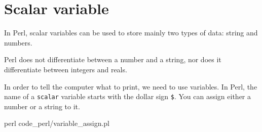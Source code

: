 \documentclass[]{book}
\makeatletter
\newenvironment{Shaded}{\begin{snugshade}}{\end{snugshade}}
\newcommand{\CharTok}[1]{\textcolor[rgb]{0.31,0.60,0.02}{#1}}
\newcommand{\CommentTok}[1]{\textcolor[rgb]{0.56,0.35,0.01}{\textit{#1}}}
\newcommand{\DataTypeTok}[1]{\textcolor[rgb]{0.13,0.29,0.53}{#1}}
\newcommand{\FunctionTok}[1]{\textcolor[rgb]{0.00,0.00,0.00}{#1}}
\newcommand{\KeywordTok}[1]{\textcolor[rgb]{0.13,0.29,0.53}{\textbf{#1}}}
\newcommand{\NormalTok}[1]{#1}
\newcommand{\StringTok}[1]{\textcolor[rgb]{0.31,0.60,0.02}{#1}}
\newenvironment{kframe}{%
\medskip{}
\setlength{\fboxsep}{.8em}
 \def\at@end@of@kframe{}%
 \ifinner\ifhmode%
  \def\at@end@of@kframe{\end{minipage}}%
  \begin{minipage}{\columnwidth}%
 \fi\fi%
 \def\FrameCommand##1{\hskip\@totalleftmargin \hskip-\fboxsep
 \colorbox{shadecolor}{##1}\hskip-\fboxsep
     \hskip-\linewidth \hskip-\@totalleftmargin \hskip\columnwidth}%
 \MakeFramed {\advance\hsize-\width
   \@totalleftmargin\z@ \linewidth\hsize
   \@setminipage}}%
 {\par\unskip\endMakeFramed%
 \at@end@of@kframe}
\renewenvironment{Shaded}{\begin{kframe}}{\end{kframe}}
\makeatother
\begin{document}
\hypertarget{scalar-variable}{%
\section{Scalar variable}\label{scalar-variable}}

In Perl, scalar variables can be used to store mainly two types of data: string and numbers.

Perl does not differentiate between a number and a string, nor does it differentiate between integers and reals.

In order to tell the computer what to print, we need to use variables. In Perl, the name of a \texttt{scalar} variable starts with the dollar sign \texttt{\$}. You can assign either a number or a string to it.

\begin{Shaded}
\end{Shaded}

\begin{Shaded}
\begin{Highlighting}[]
\FunctionTok{perl}\NormalTok{ code_perl/variable_assign.pl}
\end{Highlighting}
\end{Shaded}
\end{document}
